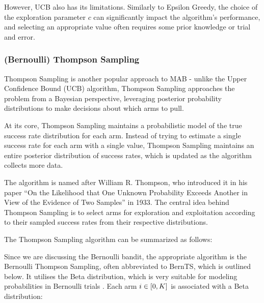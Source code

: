 
However, UCB also has its limitations. Similarly to Epsilon Greedy, the choice of the exploration parameter $c$ can significantly impact the algorithm's performance, and selecting an appropriate value often requires some prior knowledge or trial and error.


\subsubsection{(Bernoulli) Thompson Sampling}
\label{sec:BernoulliThompsonSampling}
Thompson Sampling is another popular approach to MAB - unlike the Upper Confidence Bound (UCB) algorithm, Thompson Sampling approaches the problem from a Bayesian perspective, leveraging posterior probability distributions to make decisions about which arms to pull.

At its core, Thompson Sampling maintains a probabilistic model of the true success rate distribution for each arm. Instead of trying to estimate a single success rate for each arm with a single value, Thompson Sampling maintains an entire posterior distribution of success rates, which is updated as the algorithm collects more data.

The algorithm is named after William R. Thompson, who introduced it in his paper ``On the Likelihood that One Unknown Probability Exceeds Another in View of the Evidence of Two Samples'' \cite{Thompson_1933} in 1933. The central idea behind Thompson Sampling is to select arms for exploration and exploitation according to their sampled success rates from their respective distributions.

The Thompson Sampling algorithm can be summarized as follows:


Since we are discussing the Bernoulli bandit, the appropriate algorithm is the Bernoulli Thompson Sampling, often abbreviated to BernTS, which is outlined below. It utilises the Beta distribution, which is very suitable for modeling probabilities in Bernoulli trials . Each arm $i \in [0, K]$ is associated with a Beta distribution:

